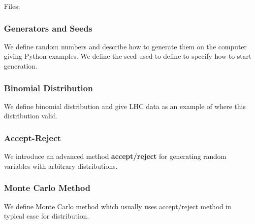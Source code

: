 
Files:


\subsubsection{Generators and Seeds}\label{generators-and-seeds}

We define random numbers and describe how to generate them on the
computer giving Python examples. We define the seed used to define to
specify how to start generation.



\subsubsection{Binomial Distribution}\label{binomial-distribution}

We define binomial distribution and give LHC data as an example of where
this distribution valid.


\subsubsection{Accept-Reject}\label{accept-reject}

We introduce an advanced method \textbf{accept/reject} for generating
random variables with arbitrary distributions.


\subsubsection{Monte Carlo Method}\label{monte-carlo-method}

We define Monte Carlo method which usually uses accept/reject method in
typical case for distribution.


